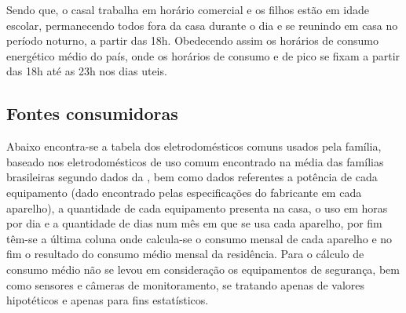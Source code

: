 	Sendo que, o casal trabalha em horário comercial e os filhos estão em idade escolar, permanecendo todos fora da casa durante o dia e se reunindo em casa no período noturno, a partir das 18h. Obedecendo assim os horários de consumo energético médio do país, onde os horários de consumo e de pico se fixam a partir das 18h até as 23h nos dias uteis.

\subsection{Fontes consumidoras}

	Abaixo encontra-se a tabela dos eletrodomésticos comuns usados pela família, baseado nos eletrodomésticos de uso comum encontrado na média das famílias brasileiras segundo dados da \cite{2013Aneel}, bem como dados referentes a potência de cada equipamento (dado encontrado pelas especificações do fabricante em cada aparelho), a quantidade de cada equipamento presenta na casa, o uso em horas por dia e a quantidade de dias num mês em que se usa cada aparelho, por fim têm-se a última coluna onde calcula-se o consumo mensal de cada aparelho e no fim o resultado do consumo médio mensal da residência. Para o cálculo de consumo médio não se levou em consideração os equipamentos de segurança, bem como sensores e câmeras de monitoramento, se tratando apenas de valores hipotéticos e apenas para fins estatísticos.



